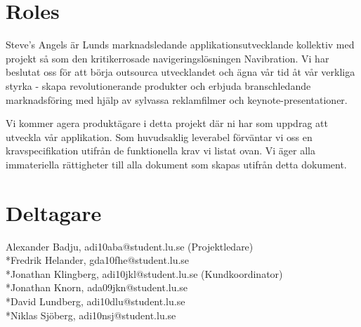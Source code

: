 \documentclass[10pt]{article}
\begin{document}
\section*{Roles}
\sloppy
\noindent Steve's Angels är Lunds marknadsledande applikationsutvecklande kollektiv med projekt så som den kritikerrosade navigeringslösningen Navibration. Vi har beslutat oss för att börja outsourca utvecklandet och ägna vår tid åt vår verkliga styrka - skapa revolutionerande produkter och erbjuda branschledande marknadsföring med hjälp av sylvassa reklamfilmer och keynote-presentationer.

Vi kommer agera produktägare i detta projekt där ni har som uppdrag att utveckla vår applikation. Som huvudsaklig leverabel förväntar vi oss en kravspecifikation utifrån de funktionella krav vi listat ovan. Vi äger alla immateriella rättigheter till alla dokument som skapas utifrån detta dokument.

\section*{Deltagare}
\noindent Alexander Badju, adi10aba@student.lu.se (Projektledare)	
\\*Fredrik Helander, gda10fhe@student.lu.se 
\\*Jonathan Klingberg, adi10jkl@student.lu.se (Kundkoordinator)
\\*Jonathan Knorn, ada09jkn@student.lu.se 
\\*David Lundberg, adi10dlu@student.lu.se 
\\*Niklas Sjöberg, adi10nsj@student.lu.se
\end{document}
